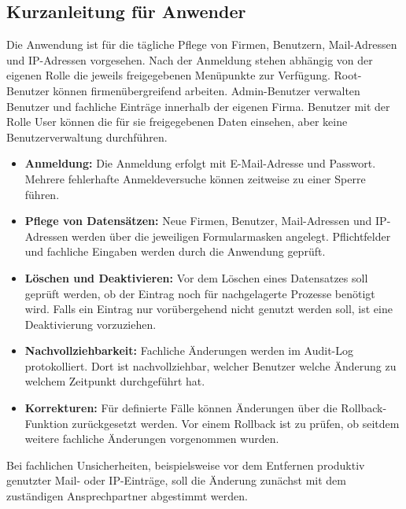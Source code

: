 \subsection{Kurzanleitung für Anwender}
\label{app:Kundenhinweis}
Die Anwendung ist für die tägliche Pflege von Firmen, Benutzern,
Mail-Adressen und IP-Adressen vorgesehen. Nach der Anmeldung stehen abhängig
von der eigenen Rolle die jeweils freigegebenen Menüpunkte zur Verfügung.
Root-Benutzer können firmenübergreifend arbeiten. Admin-Benutzer verwalten
Benutzer und fachliche Einträge innerhalb der eigenen Firma. Benutzer mit der
Rolle User können die für sie freigegebenen Daten einsehen, aber keine
Benutzerverwaltung durchführen.

\begin{itemize}
\item \textbf{Anmeldung:} Die Anmeldung erfolgt mit E-Mail-Adresse und
      Passwort. Mehrere fehlerhafte Anmeldeversuche können zeitweise zu einer
      Sperre führen.
\item \textbf{Pflege von Datensätzen:} Neue Firmen, Benutzer, Mail-Adressen
      und IP-Adressen werden über die jeweiligen Formularmasken angelegt.
      Pflichtfelder und fachliche Eingaben werden durch die Anwendung geprüft.
\item \textbf{Löschen und Deaktivieren:} Vor dem Löschen eines Datensatzes
      soll geprüft werden, ob der Eintrag noch für nachgelagerte Prozesse
      benötigt wird. Falls ein Eintrag nur vorübergehend nicht genutzt werden
      soll, ist eine Deaktivierung vorzuziehen.
\item \textbf{Nachvollziehbarkeit:} Fachliche Änderungen werden im Audit-Log
      protokolliert. Dort ist nachvollziehbar, welcher Benutzer welche
      Änderung zu welchem Zeitpunkt durchgeführt hat.
\item \textbf{Korrekturen:} Für definierte Fälle können Änderungen über
      die Rollback-Funktion zurückgesetzt werden. Vor einem Rollback ist zu
      prüfen, ob seitdem weitere fachliche Änderungen vorgenommen wurden.
\end{itemize}

Bei fachlichen Unsicherheiten, beispielsweise vor dem Entfernen produktiv
genutzter Mail- oder IP-Einträge, soll die Änderung zunächst mit dem
zuständigen Ansprechpartner abgestimmt werden.
